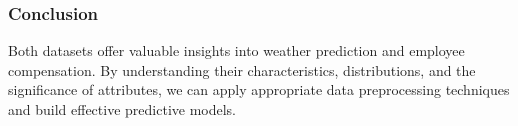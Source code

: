 \documentclass[11pt]{article}
\begin{document}
    \begin{center}
    \end{center}
    { \hspace*{\fill} \\}
    

    \begin{center}
    \end{center}
    { \hspace*{\fill} \\}
    


    \begin{center}
    \end{center}
    { \hspace*{\fill} \\}
    

\subsubsection{Conclusion}\label{conclusion}

Both datasets offer valuable insights into weather prediction and
employee compensation. By understanding their characteristics,
distributions, and the significance of attributes, we can apply
appropriate data preprocessing techniques and build effective predictive
models.


    
    
    
\end{document}
